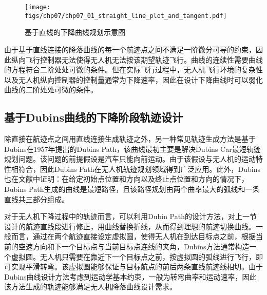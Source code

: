 \begin{figure}[ht]   
	\centering
	\texttt{[image: figs/chp07/chp07\_01\_straight\_line\_plot\_and\_tangent.pdf]}
	\caption{基于直线的下降曲线规划示意图}
	\label{fig:chp07_01_straight_line_plot_and_tangent}
\end{figure}
由于基于直线连接的降落曲线的每一个航迹点之间不满足一阶微分可导的约束，因此纵向飞行控制器无法使得无人机无法按该期望轨迹飞行。曲线的连续性需要曲线的方程符合二阶处处可微的条件。但在实际飞行过程中，无人机飞行环境的复杂性以及无人机纵向控制器的控制量通常为下降速率，因此在设计下降曲线时可以弱化曲线的二阶处处可微的条件。


\subsection{基于Dubins曲线的下降阶段轨迹设计}
除直接在航迹点之间用直线连接生成轨迹之外，另一种常见轨迹生成方法是基于Dubins在1957年提出的Dubins Path\cite{dubins1957curves}，该曲线最初主要是解决Dubins Car最短轨迹规划问题。该问题的前提假设是汽车只能向前运动。由于该假设与无人机的运动特性相符合，因此Dubins Path在无人机轨迹规划领域得到广泛应用。此外，Dubins也在文献\cite{dubins1957curves}中证明：在给定初始点位置和方向以及终止点位置和方向的情况下，Dubins Path生成的曲线是最短路径，且该路径规划由两个曲率最大的弧线和一条直线共三部分组成。

对于无人机下降过程中的轨迹而言，可以利用Dubin Path的设计方法，对上一节设计的航迹直线段进行修正，用曲线替换折线，从而得到理想的航迹切换曲线。一般而言，通过在两个航迹直接设定虚拟圆，使得无人机在到达目标点之前，根据当前的空速方向和下一个目标点与当前目标点连线的夹角，Dubins方法通常构造一个虚拟圆。无人机只需要在靠近下一个目标点之前，按虚拟圆的弧线进行飞行，即可实现平滑转弯。该虚拟圆能够保证与目标航点的前后两条直线航迹线相切。由于Dubins曲线设计方法考虑到运动学基本约束，一般为转弯曲率和运动速率，因此该方法生成的轨迹能够满足无人机降落曲线设计需求。


